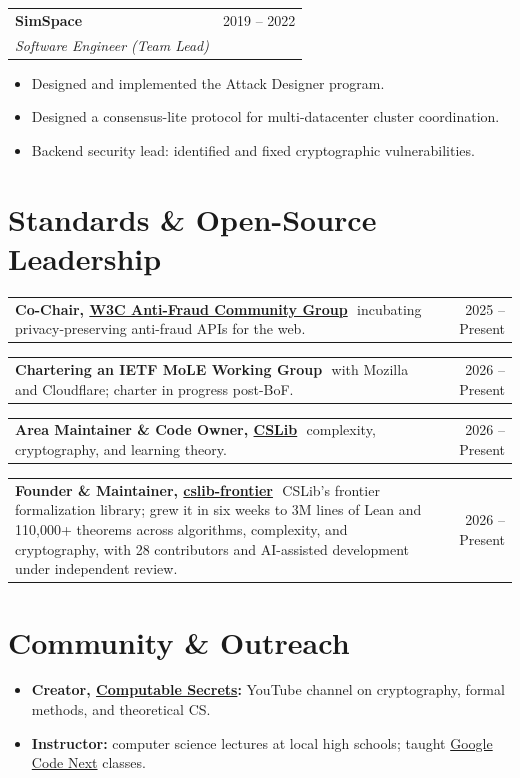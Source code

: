 \documentclass[10pt, letterpaper]{article}
\makeatletter
\newcommand{\entry}[4]{%
  \begin{tabularx}{\linewidth}{@{}X r@{}}
    \textbf{#1} & {\color{muted}\small #2} \\
    \textit{#3} & {\color{muted}\small #4} \\
  \end{tabularx}\par\vspace{-0.15em}}
\newcommand{\role}[3]{%
  \begin{tabularx}{\linewidth}{@{}X@{\hspace{1.5em}}r@{}}
    \textbf{#1}\,\,\textendash\,\,#3 & {\color{muted}\small #2} \\
  \end{tabularx}\par\vspace{0.35em}}
\makeatother
\begin{document}
\vspace{0.35em}
\entry{SimSpace}{2019 -- 2022}{Software Engineer (Team Lead)}{}
\begin{itemize}
  \item Designed and implemented the Attack Designer program.
  \item Designed a consensus-lite protocol for multi-datacenter cluster coordination.
  \item Backend security lead: identified and fixed cryptographic vulnerabilities.
\end{itemize}

\section{Standards \& Open-Source Leadership}

\role{Co-Chair, \href{https://www.w3.org/community/antifraud/}{W3C Anti-Fraud Community Group}}{2025 -- Present}
  {incubating privacy-preserving anti-fraud APIs for the web.}

\role{Chartering an IETF MoLE Working Group}{2026 -- Present}
  {with Mozilla and Cloudflare; charter in progress post-BoF.}

\role{Area Maintainer \& Code Owner, \href{https://www.cslib.io/}{CSLib}}{2026 -- Present}
  {complexity, cryptography, and learning theory.}

\role{Founder \& Maintainer, \href{https://github.com/cslib-community/cslib-frontier}{cslib-frontier}}{2026 -- Present}
  {CSLib's frontier formalization library; grew it in six weeks to 3M lines of Lean and 110{,}000+ theorems across algorithms, complexity, and cryptography, with 28 contributors and AI-assisted development under independent review.}

\section{Community \& Outreach}
\begin{itemize}
  \item \textbf{Creator, \href{https://www.youtube.com/@computablesecrets}{Computable Secrets}:} YouTube channel on cryptography, formal methods, and theoretical CS.
  \item \textbf{Instructor:} computer science lectures at local high schools; taught \href{https://codenext.withgoogle.com/}{Google Code Next} classes.
\end{itemize}
\end{document}
